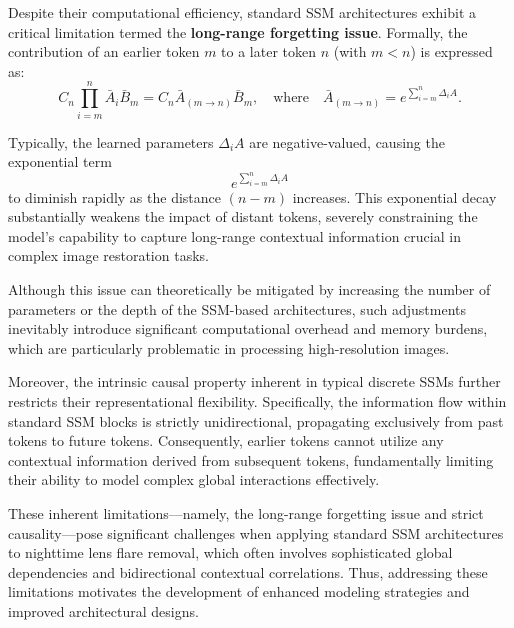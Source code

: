 \documentclass{article}
\begin{document}
Despite their computational efficiency, standard SSM architectures exhibit a critical limitation termed the \textbf{long-range forgetting issue}. Formally, the contribution of an earlier token \(m\) to a later token \(n\) (with \(m<n\)) is expressed as:
\begin{equation}
C_n\prod_{i=m}^{n}\bar{A}_i\bar{B}_m = C_n\bar{A}_{(m\to n)}\bar{B}_m,\quad\text{where}\quad\bar{A}_{(m\to n)}=e^{\sum_{i=m}^{n}\Delta_i A}.
\end{equation}

Typically, the learned parameters \(\Delta_i A\) are negative-valued, causing the exponential term
\begin{equation}
e^{\sum_{i=m}^{n}\Delta_i A}
\end{equation}
to diminish rapidly as the distance \((n - m)\) increases. This exponential decay substantially weakens the impact of distant tokens, severely constraining the model’s capability to capture long-range contextual information crucial in complex image restoration tasks.

Although this issue can theoretically be mitigated by increasing the number of parameters or the depth of the SSM-based architectures, such adjustments inevitably introduce significant computational overhead and memory burdens, which are particularly problematic in processing high-resolution images.

Moreover, the intrinsic causal property inherent in typical discrete SSMs further restricts their representational flexibility. Specifically, the information flow within standard SSM blocks is strictly unidirectional, propagating exclusively from past tokens to future tokens. Consequently, earlier tokens cannot utilize any contextual information derived from subsequent tokens, fundamentally limiting their ability to model complex global interactions effectively.

These inherent limitations—namely, the long-range forgetting issue and strict causality—pose significant challenges when applying standard SSM architectures to nighttime lens flare removal, which often involves sophisticated global dependencies and bidirectional contextual correlations. Thus, addressing these limitations motivates the development of enhanced modeling strategies and improved architectural designs.
\end{document}
